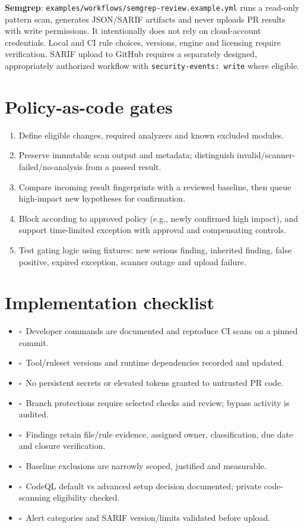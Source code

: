 \documentclass[10pt,letterpaper]{article}
\newcommand{\checkbox}{\(\square\)}
\begin{document}
\textbf{Semgrep}: \nolinkurl{examples/workflows/semgrep-review.example.yml} runs a read-only pattern scan, generates JSON/SARIF artifacts and never uploads PR results with write permissions. It intentionally does not rely on cloud-account credentials. Local and CI rule choices, versions, engine and licensing require verification. SARIF upload to GitHub requires a separately designed, appropriately authorized workflow with \texttt{security-events: write} where eligible.
\section{Policy-as-code gates}
\begin{enumerate}
\item Define eligible changes, required analyzers and known excluded modules.
\item Preserve immutable scan output and metadata; distinguish invalid/scanner-failed/no-analysis from a passed result.
\item Compare incoming result fingerprints with a reviewed baseline, then queue high-impact new hypotheses for confirmation.
\item Block according to approved policy (e.g., newly confirmed high impact), and support time-limited exception with approval and compensating controls.
\item Test gating logic using fixtures: new serious finding, inherited finding, false positive, expired exception, scanner outage and upload failure.
\end{enumerate}
\section{Implementation checklist}
\begin{itemize}
\item \checkbox\ Developer commands are documented and reproduce CI scans on a pinned commit.
\item \checkbox\ Tool/ruleset versions and runtime dependencies recorded and updated.
\item \checkbox\ No persistent secrets or elevated tokens granted to untrusted PR code.
\item \checkbox\ Branch protections require selected checks and review; bypass activity is audited.
\item \checkbox\ Findings retain file/rule evidence, assigned owner, classification, due date and closure verification.
\item \checkbox\ Baseline exclusions are narrowly scoped, justified and measurable.
\item \checkbox\ CodeQL default vs advanced setup decision documented; private code-scanning eligibility checked.
\item \checkbox\ Alert categories and SARIF version/limits validated before upload.
\end{itemize}
\end{document}
